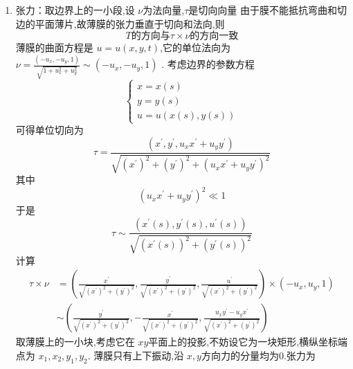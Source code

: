 \documentclass[../../PDE.tex]{subfiles}
\begin{document}
\begin{enumerate}
        \item 张力：取边界上的一小段,设 \(  \nu   \)为法向量,\(  \tau   \)是切向向量
            由于膜不能抵抗弯曲和切边的平面薄片,故薄膜的张力垂直于切向和法向,则 \[
            T \text{的方向与}   \tau  \times  \nu   \text{的方向一致} 
            \]薄膜的曲面方程是 \(  u =  u\left( x,y,t \right)   \),它的单位法向为 \(  \nu = \frac{ \left( -u_{x},-u_{y},1 \right) }{ \sqrt{1+ u_{x}^{2}+ u_{y}^{2}} }  \sim  \left( -u_{x},-u_{y},1 \right)   \)  .
            考虑边界的参数方程 \[
            \begin{cases} x =  x\left( s \right)\\ 
             y =  y\left( s \right)\\ 
              u= u\left( x\left( s \right),y\left( s \right)   \right)    \end{cases} 
            \]可得单位切向为 \[
                \tau  =  \frac{\left( x^{\prime} ,y^{\prime} ,u_{x} x^{\prime} + u_{y}y^{\prime}  \right)  }{\sqrt{\left( x^{\prime}  \right)^{2}+ \left( y^{\prime}  \right)^{2}+  \left( u_{x}x^{\prime} + u_{y}y^{\prime}  \right)^{2}   } } 
            \]其中 \[
            \left( u_{x}x^{\prime} + u_{y}y^{\prime}  \right)^{2}\ll 1 
            \]于是 \[
            \tau \sim  \frac{\left( x^{\prime} \left( s \right),y^{\prime} \left( s \right)   ,u^{\prime} \left( s \right) \right)  }{\sqrt{\left( x^{\prime} \left( s \right)  \right)^{2}+ \left( y^{\prime} \left( s \right)  \right)^{2}  } } 
            \]计算 \[
            \begin{aligned}
                \tau  \times  \nu & = \left( \frac{x^{\prime}  }{ \sqrt{\left( x^{\prime}  \right)^{2}+  \left( y^{\prime}  \right)^{2}  }} ,\frac{y^{\prime}  }{\sqrt{\left( x^{\prime}  \right)^{2}+ \left( y^{\prime}  \right)^{2}  } },  \frac{u^{\prime}  }{\sqrt{\left( x^{\prime}  \right)^{2}+ \left( y^{\prime}  \right)^{2}  } }   \right) \times  \left( -u_{x},u_{y},1 \right)  \\ 
             &  \sim  \left( \frac{y^{\prime}  }{\sqrt{\left( x^{\prime}  \right)^{2}+ \left( y^{\prime}  \right)^{2}  } }, - \frac{x^{\prime}  }{\sqrt{\left( x^{\prime}  \right)^{2}+ \left( y^{\prime}  \right)^{2}  } } , \frac{ u_{x}y^{\prime} -u _{y}x^{\prime}  }{ \sqrt{\left( x^{\prime}  \right)^{2}+ \left( y^{\prime}  \right)^{2}  }}    \right) 
            \end{aligned}
            \]取薄膜上的一小块,考虑它在 \(  xy  \)平面上的投影,不妨设它为一块矩形,横纵坐标端点为 \(  x_1,x_2,y_1,y_2  \). 薄膜只有上下振动,沿 \(  x,y  \)方向力的分量均为0.张力为 \[
\]
\end{enumerate}
\end{document}
